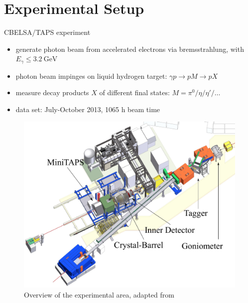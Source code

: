\documentclass[11pt,aspectratio=169,dvipsnames]{beamer}
\begin{document}
\section{Experimental Setup}
\begin{frame}{CBELSA/TAPS experiment}
	\begin{minipage}{.3\linewidth}
	{\small
			\begin{itemize}
			\item generate photon beam from accelerated electrons via bremsstrahlung, with $E_\gamma\leq\SI{3.2}{\giga\eV}$ 
			\item photon beam impinges on liquid hydrogen target: $\gamma p \to p M\to p X$
			\item measure decay products $X$ of different final states: $M=\pi^0/\eta/\eta'/\dots$
			\item data set: July-October 2013, 1065 h beam time
		\end{itemize}
	}
	\end{minipage}
	\begin{minipage}{.69\linewidth}
			\begin{figure}
			\centering
			\includegraphics[width=.9\linewidth]{CB-Area}
			\caption*{Overview of the experimental area, adapted from }
		\end{figure}
	\end{minipage}

\end{frame}
\end{document}

